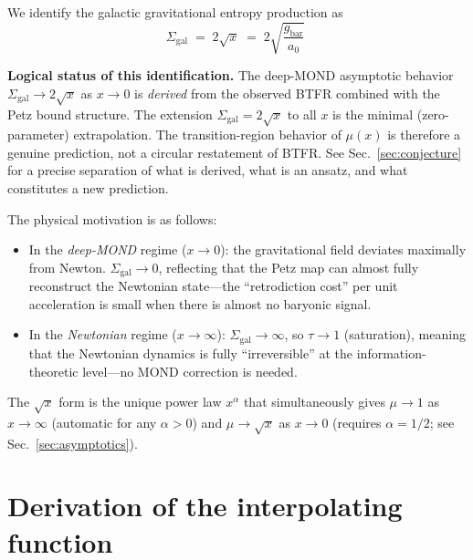 \documentclass[prd,twocolumn,superscriptaddress,longbibliography,floatfix]{revtex4-2}
\newcommand{\tauasym}{\tau}
\begin{document}
We identify the galactic gravitational entropy production as
\begin{equation}
  \boxed{\;\Sigma_{\mathrm{gal}} \;=\; 2\sqrt{x}
  \;=\; 2\sqrt{\frac{g_{\mathrm{bar}}}{a_0}}\;\;}
  \label{eq:sigma-gal}
\end{equation}

\textbf{Logical status of this identification.}
The deep-MOND asymptotic behavior $\Sigma_{\mathrm{gal}} \to 2\sqrt{x}$
as $x \to 0$ is \emph{derived} from the observed BTFR combined with
the Petz bound structure. The extension $\Sigma_{\mathrm{gal}} = 2\sqrt{x}$
to all $x$ is the minimal (zero-parameter) extrapolation.
The transition-region behavior of $\mu(x)$ is therefore a genuine
prediction, not a circular restatement of BTFR.
See Sec.~\ref{sec:conjecture} for a precise separation of what is
derived, what is an ansatz, and what constitutes a new prediction.

The physical motivation is as follows:
\begin{itemize}
  \item In the \emph{deep-MOND} regime ($x \to 0$): the
    gravitational field deviates maximally from Newton.
    $\Sigma_{\mathrm{gal}} \to 0$, reflecting that the
    Petz map can almost fully reconstruct the Newtonian
    state---the ``retrodiction cost'' per unit acceleration
    is small when there is almost no baryonic signal.
  \item In the \emph{Newtonian} regime ($x \to \infty$):
    $\Sigma_{\mathrm{gal}} \to \infty$, so
    $\tauasym \to 1$ (saturation), meaning that the
    Newtonian dynamics is fully ``irreversible'' at the
    information-theoretic level---no MOND correction is needed.
\end{itemize}

The $\sqrt{x}$ form is the unique power law $x^\alpha$ that
simultaneously gives $\mu \to 1$ as $x \to \infty$ (automatic
for any $\alpha > 0$) and $\mu \to \sqrt{x}$ as $x \to 0$
(requires $\alpha = 1/2$; see Sec.~\ref{sec:asymptotics}).

\section{Derivation of the interpolating function}
\label{sec:derivation}
\end{document}
